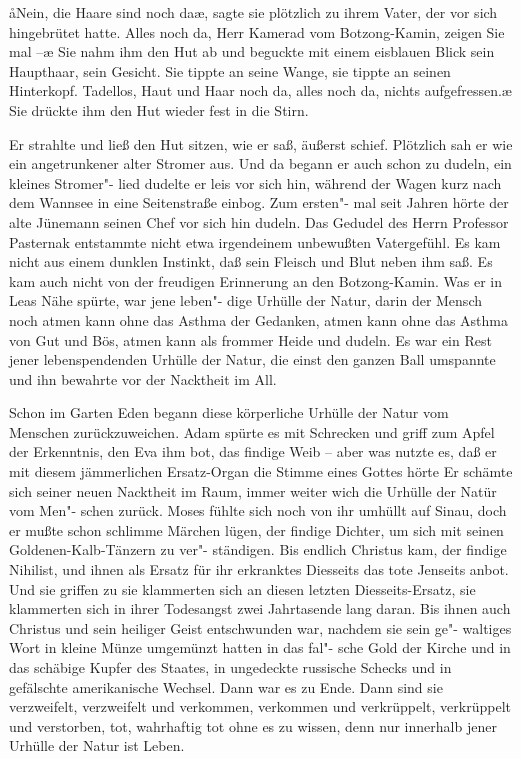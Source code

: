 \aa{}Nein, die Haare sind noch da\ae{}, sagte sie plötzlich zu ihrem
Vater, der vor sich hingebrütet hatte. \aanah{}Alles noch da, Herr
Kamerad vom Botzong-Kamin, zeigen Sie mal --\ae{} Sie nahm
ihm den Hut ab und beguckte mit einem eisblauen Blick sein
Haupthaar, sein Gesicht. Sie tippte an seine Wange, sie
tippte an seinen Hinterkopf. \aanah{}Tadellos, Haut und Haar
noch da, alles noch da, nichts aufgefressen.\ae{} Sie drückte ihm
den Hut wieder fest in die Stirn.

Er strahlte und ließ den Hut sitzen, wie er saß, äußerst schief.
Plötzlich sah er wie ein angetrunkener alter Stromer aus.
Und da begann er auch schon zu dudeln, ein kleines Stromer"-%
lied dudelte er leis vor sich hin, während der Wagen kurz
nach dem Wannsee in eine Seitenstraße einbog. Zum ersten"-%
mal seit Jahren hörte der alte Jünemann seinen Chef vor
sich hin dudeln.
\abstand{}
Das Gedudel des Herrn Professor Pasternak entstammte nicht
etwa irgendeinem unbewußten Vatergefühl. Es kam nicht aus
einem dunklen Instinkt, daß sein Fleisch und Blut neben ihm
saß. Es kam auch nicht von der freudigen Erinnerung an den
Botzong-Kamin. Was er in Leas Nähe spürte, war jene leben"-%
dige Urhülle der Natur, darin der Mensch noch atmen kann
ohne das Asthma der Gedanken, atmen kann ohne das Asthma
von Gut und Bös, atmen kann als frommer Heide und dudeln.
Es war ein Rest jener lebenspendenden Urhülle der Natur,
die einst den ganzen Ball umspannte und ihn bewahrte vor
der Nacktheit im All.

 Schon im Garten Eden begann diese körperliche
Urhülle der Natur vom Menschen zurückzuweichen. Adam
spürte es mit Schrecken und griff zum Apfel der Erkenntnis,
den Eva ihm bot, das findige Weib -- aber was nutzte es,
daß er mit diesem jämmerlichen Ersatz-Organ die Stimme
eines Gottes hörte\frag{} Er schämte sich seiner neuen Nacktheit im
Raum, immer weiter wich die Urhülle der Natür vom Men"-%
schen zurück. Moses fühlte sich noch von ihr umhüllt auf Sinau,
doch er mußte schon schlimme Märchen lügen, der findige
Dichter, um sich mit seinen Goldenen-Kalb-Tänzern zu ver"-%
ständigen. Bis endlich Christus kam, der findige Nihilist, und
ihnen als Ersatz für ihr erkranktes Diesseits das tote Jenseits
anbot. Und sie griffen zu sie klammerten sich an diesen letzten
Diesseits-Ersatz, sie klammerten sich in ihrer Todesangst
zwei Jahrtasende lang daran. Bis ihnen auch Christus und
sein heiliger Geist entschwunden war, nachdem sie sein ge"-%
waltiges Wort in kleine Münze umgemünzt hatten\dopp{} in das fal"-%
sche Gold der Kirche und in das schäbige Kupfer des Staates,
in ungedeckte russische Schecks und in gefälschte amerikanische
Wechsel. Dann war es zu Ende. Dann sind sie verzweifelt,
verzweifelt und verkommen, verkommen und verkrüppelt,
verkrüppelt und verstorben, tot, wahrhaftig tot ohne es zu
wissen, denn nur innerhalb jener Urhülle der Natur ist
Leben.

